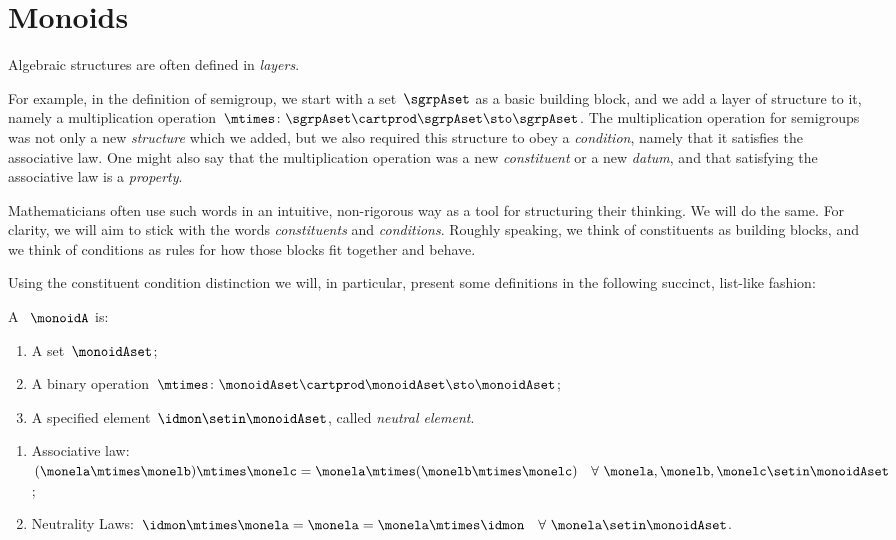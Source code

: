 
\section{Monoids}
\label{sec:parallelism-monoids}

Algebraic structures are often defined in \emph{layers}.

For example, in the definition of semigroup, we start with a set~$\sgrpAset$ as a basic building block, and we add a layer of structure to it, namely a multiplication operation~$\mtimes \colon \sgrpAset \cartprod \sgrpAset \sto \sgrpAset$.
The multiplication operation for semigroups was not only a new \emph{structure} which we added, but we also required this structure to obey a \emph{condition}, namely that it satisfies the associative law.
One might also say that the multiplication operation was a new \emph{constituent} or a new \emph{datum}, and that satisfying the associative law is a \emph{property}.


Mathematicians often use such words in an intuitive, non-rigorous way as a tool for structuring their thinking.
We will do the same.
For clarity, we will aim to stick with the words \emph{constituents} and \emph{conditions}.
Roughly speaking, we think of constituents as building blocks, and we think of conditions as rules for how those blocks fit together and behave.

Using the constituent \vs condition distinction we will, in particular, present some definitions in the following succinct, list-like fashion:

\begin{ctdefinition}[Monoid]
    \label{def:monoid}
    A \emph{}~$\monoidA$  is:
    \begin{body}
        \constit
        \begin{enumerate}
            \item A set~$\monoidAset$;
            \item A binary operation~$\mtimes  \colon \monoidAset \cartprod \monoidAset \sto \monoidAset$;
            \item A specified element~$\idmon \setin \monoidAset$, called \emph{neutral element}.
        \end{enumerate}
        \condit
        \begin{enumerate}
            \item Associative law:~$(\monela\mtimes  \monelb)\mtimes  \monelc=
                      \monela\mtimes  (\monelb\mtimes  \monelc) \quad  \forall \  \monela, \monelb, \monelc \setin \monoidAset$;
            \item Neutrality Laws:~$\idmon\mtimes \monela=\monela=\monela\mtimes  \idmon \quad  \forall \ \monela \setin \monoidAset $.
        \end{enumerate}
    \end{body}
\end{ctdefinition}

